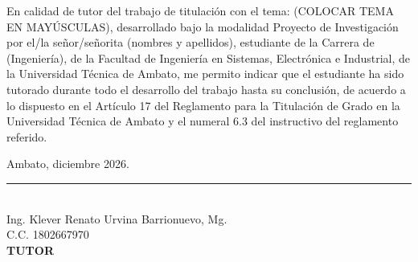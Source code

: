 
En calidad de tutor del trabajo de titulación con el tema: (COLOCAR TEMA EN MAYÚSCULAS),
desarrollado bajo la modalidad Proyecto de Investigación por el/la señor/señorita
(nombres y apellidos), estudiante de la Carrera de (Ingeniería), de la Facultad de
Ingeniería en Sistemas, Electrónica e Industrial, de la Universidad Técnica de Ambato,
me permito indicar que el estudiante ha sido tutorado durante todo el desarrollo del
trabajo hasta su conclusión, de acuerdo a lo dispuesto en el Artículo 17 del Reglamento
para la Titulación de Grado en la Universidad Técnica de Ambato y el numeral 6.3 del
instructivo del reglamento referido.

\vspace{2em}
\begin{flushright}
    Ambato, diciembre 2026.
\end{flushright}

\vspace{4em}
\begin{center}
    \rule{6cm}{0.4pt}\\[0.2cm]
    Ing. Klever Renato Urvina Barrionuevo, Mg.\\
    C.C. 1802667970\\[0.1cm]
    \textbf{TUTOR}
\end{center}
